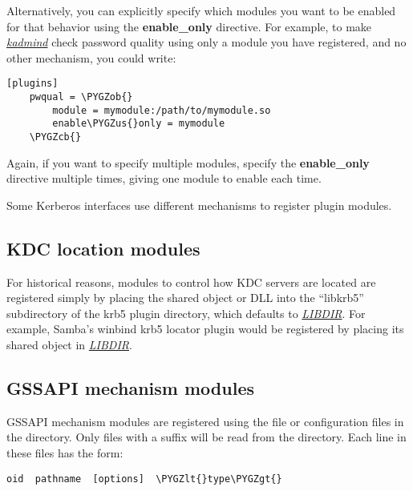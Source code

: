 \documentclass[letterpaper,10pt,english]{sphinxmanual}
\def\PYGZus{\char`\_}
\def\PYGZob{\char`\{}
\def\PYGZcb{\char`\}}
\def\PYGZlt{\char`\<}
\def\PYGZgt{\char`\>}
\begin{document}
Alternatively, you can explicitly specify which modules you want to be
enabled for that behavior using the \textbf{enable\_only} directive.  For
example, to make {\hyperref[admin/admin_commands/kadmind:kadmind-8]{\emph{kadmind}}} check password quality using only a
module you have registered, and no other mechanism, you could write:

\begin{Verbatim}[commandchars=\\\{\}]
[plugins]
    pwqual = \PYGZob{}
        module = mymodule:/path/to/mymodule.so
        enable\PYGZus{}only = mymodule
    \PYGZcb{}
\end{Verbatim}

Again, if you want to specify multiple modules, specify the
\textbf{enable\_only} directive multiple times, giving one module to enable
each time.

Some Kerberos interfaces use different mechanisms to register plugin
modules.


\subsection{KDC location modules}
\label{admin/host_config:kdc-location-modules}
For historical reasons, modules to control how KDC servers are located
are registered simply by placing the shared object or DLL into the
``libkrb5'' subdirectory of the krb5 plugin directory, which defaults to
{\hyperref[mitK5defaults:paths]{\emph{LIBDIR}}}.  For example, Samba's winbind krb5
locator plugin would be registered by placing its shared object in
{\hyperref[mitK5defaults:paths]{\emph{LIBDIR}}}.


\subsection{GSSAPI mechanism modules}
\label{admin/host_config:gssapi-plugin-config}\label{admin/host_config:gssapi-mechanism-modules}
GSSAPI mechanism modules are registered using the file
 or configuration files in the 
directory.  Only files with a  suffix will be read from the
 directory.  Each line in these files has the
form:

\begin{Verbatim}[commandchars=\\\{\}]
oid  pathname  [options]  \PYGZlt{}type\PYGZgt{}
\end{Verbatim}
\end{document}
